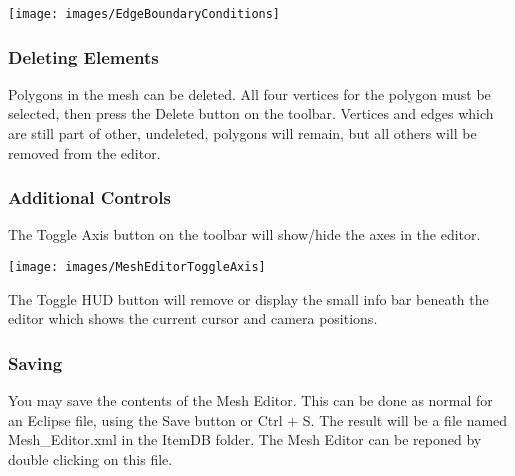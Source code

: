 \begin{center}
\texttt{[image: images/EdgeBoundaryConditions]}
\end{center}

\subsubsection{Deleting Elements}

Polygons in the mesh can be deleted. All four vertices for the polygon must be
selected, then press the Delete button on the toolbar. Vertices and edges which
are still part of other, undeleted, polygons will remain, but all others will be
removed from the editor.

\subsubsection{Additional Controls}

The Toggle Axis button on the toolbar will show/hide the axes in the editor. 

\begin{center}
\texttt{[image: images/MeshEditorToggleAxis]}
\end{center}

The Toggle HUD button will remove or display the small info bar beneath the
editor which shows the current cursor and camera positions.

\subsubsection{Saving}

You may save the contents of the Mesh Editor. This can be done as normal for
an Eclipse file, using the Save button or Ctrl + S. The result will be a file
named Mesh\_Editor.xml in the ItemDB folder. The Mesh Editor can be
reponed by double clicking on this file. 